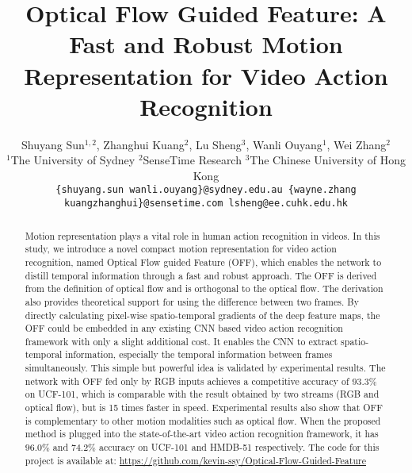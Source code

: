 \documentclass[10pt,twocolumn,letterpaper]{article}
\begin{document}
\title{Optical Flow Guided Feature: A Fast and Robust Motion Representation for Video Action Recognition}
\author{
Shuyang Sun$^{1,2}$, \hspace{1px} Zhanghui Kuang$^2$, \hspace{1px} Lu Sheng$^3$, \hspace{1px} Wanli Ouyang$^1$, \hspace{1px} Wei Zhang$^2$\\
$^1$The University of Sydney \hspace{3px} $ ^2$SenseTime Research \hspace{3px} $ ^3$The Chinese University of Hong Kong\\
{\tt\small \{shuyang.sun wanli.ouyang\}@sydney.edu.au \hspace{2px} \{wayne.zhang kuangzhanghui\}@sensetime.com\hspace{2px} lsheng@ee.cuhk.edu.hk}
}


\maketitle
\begin{abstract}
Motion representation plays a vital role in human action recognition in videos. In this study, we introduce a novel compact motion representation for video action recognition, named Optical Flow guided Feature (OFF), which enables the network to distill temporal information through a fast and robust approach.
The OFF is derived from the definition of optical flow and is orthogonal to the optical flow. The derivation also provides theoretical support for using the difference between two frames.
By directly calculating pixel-wise spatio-temporal gradients of the deep feature maps, the OFF could be embedded in any existing CNN based video action recognition framework with only a slight additional cost. It enables the CNN to extract spatio-temporal information, especially the temporal information between frames simultaneously. This simple but powerful idea is validated by experimental results. The network with OFF fed only by RGB inputs achieves a competitive accuracy of $93.3\%$ on UCF-101, which is comparable with the result obtained by two streams (RGB and optical flow), but is 15 times faster in speed. Experimental results also show that OFF is complementary to other motion modalities such as optical flow. When the proposed method is plugged into the state-of-the-art video action recognition framework, it has $96.0\%$ and $74.2\%$ accuracy on UCF-101 and HMDB-51 respectively. The code for this project is available at: \href{https://github.com/kevin-ssy/Optical-Flow-Guided-Feature}{https://github.com/kevin-ssy/Optical-Flow-Guided-Feature}





\end{abstract}
\end{document}
